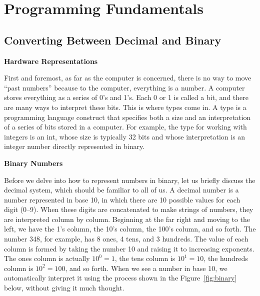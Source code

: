 \documentclass[11pt, a4paper]{article}
\begin{document}
\title{}
\author{Samuel Navarro}
\date{\today}
\maketitle
\tableofcontents{}

\section{Programming Fundamentals}%
\label{sec:programming_fundamentals}

\subsection{Converting Between Decimal and Binary}%
\label{sub:converting_between_decimal_and_binary}


\textbf{Hardware Representations}

First and foremost, as far as the computer is concerned, there is no way to move “past numbers” because to the computer, everything is a number. A computer stores everything as a series of 0’s and 1’s. Each 0 or 1 is called a bit, and there are many ways to interpret these bits. This is where types come in. A type is a programming language construct that specifies both a size and an interpretation of a series of bits stored in a computer. For example, the type for working with integers is an int, whose size is typically 32 bits and whose interpretation is an integer number directly represented in binary.


\textbf{Binary Numbers}

Before we delve into how to represent numbers in binary, let us briefly discuss the decimal system, which should be familiar to all of us. A decimal number is a number represented in base 10, in which there are 10 possible values for each digit (0–9). When these digits are concatenated to make strings of numbers, they are interpreted column by column. Beginning at the far right and moving to the left, we have the 1’s column, the 10’s column, the 100’s column, and so forth. The number 348, for example, has 8 ones, 4 tens, and 3 hundreds. The value of each column is formed by taking the number 10 and raising it to increasing exponents. The ones column is actually $10^{0}=1$, the tens column is $10^{1}=10$, the hundreds column is $10^{2}=100$, and so forth. When we see a number in base 10, we automatically interpret it using the process shown in the Figure~\ref{fig:binary} below, without giving it much thought.
\end{document}
